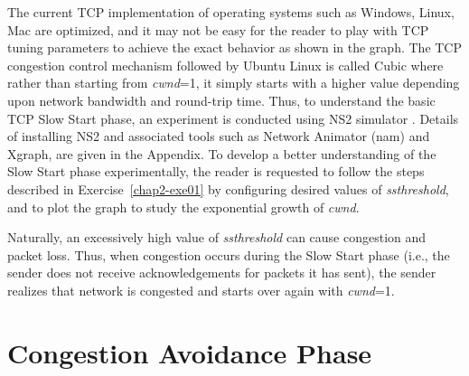 \begin{multicols}{2}
The current TCP implementation of operating systems such as Windows, Linux, Mac are optimized, and it may not be easy for the reader to play with TCP tuning parameters to achieve the exact behavior as shown in the graph. The TCP congestion control mechanism followed by Ubuntu Linux is called Cubic \cite{art2-key08} where rather than starting from \textit{cwnd}=1, it simply starts with a higher value depending upon network bandwidth and round-trip time. Thus, to understand the basic TCP Slow Start phase, an experiment is conducted using NS2 simulator \cite{art2-key09}. Details of installing NS2 and associated tools such as Network Animator (nam) \cite{art2-key10} and Xgraph\cite{art2-key11}, are given in the Appendix. To develop a better understanding of the Slow Start phase experimentally, the reader is requested to follow the steps described in Exercise~\ref{chap2-exe01} by configuring desired values of \textit{ssthreshold}, and to plot the graph to study the exponential growth of \textit{cwnd}.

Naturally, an excessively high value of \textit{ssthreshold} can cause congestion and packet loss. Thus, when congestion occurs during the Slow Start phase (i.e., the sender does not receive acknowledgements for packets it has sent), the sender realizes that network is congested and starts over again with \textit{cwnd}=1.

\section{Congestion Avoidance Phase}


\end{multicols}

